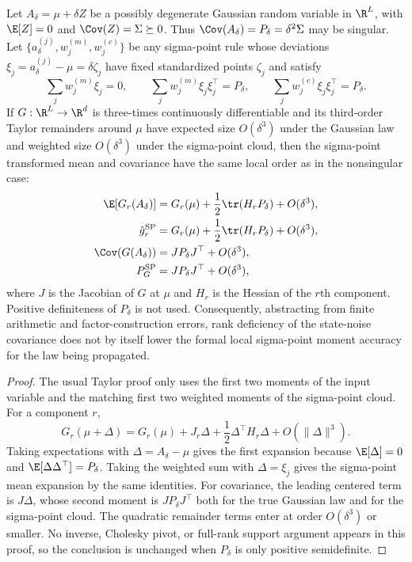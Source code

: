 \begin{proposition}
\label{prop:bf-degenerate-covariance-formal-ut-accuracy}
Let $A_\delta=\mu+\delta Z$ be a possibly degenerate Gaussian random
variable in $\R^L$, with $\E[Z]=0$ and
$\Cov(Z)=\Sigma\succeq0$.  Thus
$\Cov(A_\delta)=P_\delta=\delta^2\Sigma$ may be singular.  Let
$\{a_\delta^{(j)},w_j^{(m)},w_j^{(c)}\}$ be any sigma-point rule whose
deviations $\xi_j=a_\delta^{(j)}-\mu=\delta\zeta_j$ have fixed standardized
points $\zeta_j$ and satisfy
\[
  \sum_j w_j^{(m)}\xi_j=0,\qquad
  \sum_j w_j^{(m)}\xi_j\xi_j^\top=P_\delta,\qquad
  \sum_j w_j^{(c)}\xi_j\xi_j^\top=P_\delta .
\]
If $G:\R^L\to\R^d$ is three-times continuously differentiable and its
third-order Taylor remainders around $\mu$ have expected size $O(\delta^3)$
under the Gaussian law and weighted size $O(\delta^3)$ under the sigma-point
cloud, then the sigma-point transformed mean and covariance have the same local
order as in the nonsingular case:
\begin{align}
  \E[G_r(A_\delta)]
    &=
    G_r(\mu)+\frac{1}{2}\tr(H_rP_\delta)+O(\delta^3),\\
  \hat g_r^{\mathrm{SP}}
    &=
    G_r(\mu)+\frac{1}{2}\tr(H_rP_\delta)+O(\delta^3),\\
  \Cov(G(A_\delta))
    &=
    JP_\delta J^\top+O(\delta^3),\\
  P_G^{\mathrm{SP}}
    &=
    JP_\delta J^\top+O(\delta^3),
\end{align}
where $J$ is the Jacobian of $G$ at $\mu$ and $H_r$ is the Hessian of
the $r$th component.  Positive definiteness of $P_\delta$ is not used.
Consequently, abstracting from finite arithmetic and factor-construction
errors, rank deficiency of the state-noise covariance does not by itself lower
the formal local sigma-point moment accuracy for the law being propagated.
\end{proposition}

\begin{proof}
The usual Taylor proof only uses the first two moments of the input variable
and the matching first two weighted moments of the sigma-point cloud.  For a
component $r$,
\[
  G_r(\mu+\Delta)
  =
  G_r(\mu)+J_r\Delta+\frac{1}{2}\Delta^\top H_r\Delta
  +O(\|\Delta\|^3).
\]
Taking expectations with $\Delta=A_\delta-\mu$ gives the first expansion
because $\E[\Delta]=0$ and $\E[\Delta\Delta^\top]=P_\delta$.  Taking the
weighted sum with $\Delta=\xi_j$ gives the sigma-point mean expansion by the
same identities.  For covariance, the leading centered term is
$J\Delta$, whose second moment is $JP_\delta J^\top$ both for the true
Gaussian law and for the sigma-point cloud.  The quadratic remainder terms
enter at order $O(\delta^3)$ or smaller.  No inverse, Cholesky pivot, or
full-rank support argument appears in this proof, so the conclusion is
unchanged when $P_\delta$ is only positive semidefinite.
\end{proof}

